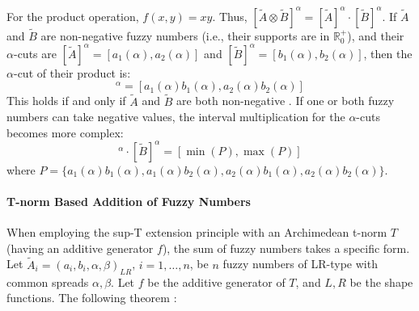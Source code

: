 For the product operation, $f(x,y) = xy$. Thus, $[\tilde{A} \otimes \tilde{B}]^\alpha = [\tilde{A}]^\alpha \cdot [\tilde{B}]^\alpha$.
If $\tilde{A}$ and $\tilde{B}$ are non-negative fuzzy numbers (i.e., their supports are in $\mathbb{R}^+_0$), and their $\alpha$-cuts are $[\tilde{A}]^\alpha = [a_1(\alpha), a_2(\alpha)]$ and $[\tilde{B}]^\alpha = [b_1(\alpha), b_2(\alpha)]$, then the $\alpha$-cut of their product is:
\begin{equation}
[\tilde{A} \otimes \tilde{B}]^\alpha = [a_1(\alpha)b_1(\alpha), a_2(\alpha)b_2(\alpha)]
\end{equation}
This holds if and only if $\tilde{A}$ and $\tilde{B}$ are both non-negative \cite[p.18]{FULLER2}.
If one or both fuzzy numbers can take negative values, the interval multiplication for the $\alpha$-cuts becomes more complex:
\begin{equation}
[\tilde{A}]^\alpha \cdot [\tilde{B}]^\alpha = [\min(P), \max(P)]
\end{equation}
where $P = \{a_1(\alpha)b_1(\alpha), a_1(\alpha)b_2(\alpha), a_2(\alpha)b_1(\alpha), a_2(\alpha)b_2(\alpha)\}$.



\paragraph{T-norm Based Addition of Fuzzy Numbers}
When employing the sup-T extension principle with an Archimedean t-norm $T$ (having an additive generator $f$), the sum of fuzzy numbers takes a specific form.
Let $\tilde{A}_i = (a_i, b_i, \alpha, \beta)_{LR}$, $i=1, \dots, n$, be $n$ fuzzy numbers of LR-type with common spreads $\alpha, \beta$.
Let $f$ be the additive generator of $T$, and $L,R$ be the shape functions. The following theorem \cite[Thm. 1.7.1]{FULLER2}:

